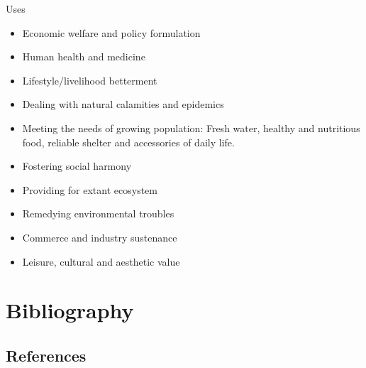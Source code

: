 \documentclass[
  ignorenonframetext,
  aspectratio=169]{beamer}
\providecommand{\tightlist}{%
  \setlength{\itemsep}{0pt}\setlength{\parskip}{0pt}}
\begin{document}
\begin{frame}{Uses}
\protect\hypertarget{uses}{}
\begin{itemize}
\tightlist
\item
  Economic welfare and policy formulation
\item
  Human health and medicine
\item
  Lifestyle/livelihood betterment
\item
  Dealing with natural calamities and epidemics
\item
  Meeting the needs of growing population: Fresh water, healthy and
  nutritious food, reliable shelter and accessories of daily life.
\item
  Fostering social harmony
\item
  Providing for extant ecosystem
\item
  Remedying environmental troubles
\item
  Commerce and industry sustenance
\item
  Leisure, cultural and aesthetic value
\end{itemize}
\end{frame}

\hypertarget{bibliography}{%
\section{Bibliography}\label{bibliography}}

\hypertarget{references}{%
\subsection{References}\label{references}}
\end{document}
